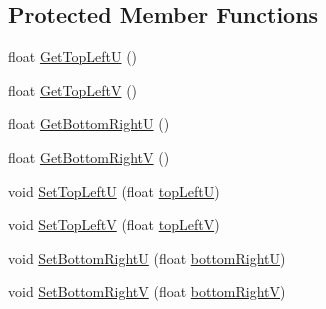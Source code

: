 \subsection*{Protected Member Functions}
\begin{DoxyCompactItemize}
\item 
float \hyperlink{class_osiris_i_1_1_graphics_1_1_actors_1_1_i_sprite_ae7cc783bbe7b0c4f1d20752ff7f34528}{Get\-Top\-Left\-U} ()
\item 
float \hyperlink{class_osiris_i_1_1_graphics_1_1_actors_1_1_i_sprite_a060e4588ac84f05574a38cf26a0601cf}{Get\-Top\-Left\-V} ()
\item 
float \hyperlink{class_osiris_i_1_1_graphics_1_1_actors_1_1_i_sprite_a6395936eeae7bb1c13db61dcefd2056f}{Get\-Bottom\-Right\-U} ()
\item 
float \hyperlink{class_osiris_i_1_1_graphics_1_1_actors_1_1_i_sprite_a32d6f6962077b0a38ae885033544ead3}{Get\-Bottom\-Right\-V} ()
\item 
void \hyperlink{class_osiris_i_1_1_graphics_1_1_actors_1_1_i_sprite_ae5f59adf02198048b5693efe303e37d2}{Set\-Top\-Left\-U} (float \hyperlink{class_osiris_i_1_1_graphics_1_1_actors_1_1_i_sprite_a13ed35d438c71402eff4f43bd062d9e1}{top\-Left\-U})
\item 
void \hyperlink{class_osiris_i_1_1_graphics_1_1_actors_1_1_i_sprite_a342063ca3954c84d33a886c231dd4180}{Set\-Top\-Left\-V} (float \hyperlink{class_osiris_i_1_1_graphics_1_1_actors_1_1_i_sprite_a0103c27e0ef4b6c0117ca3f4e0c82718}{top\-Left\-V})
\item 
void \hyperlink{class_osiris_i_1_1_graphics_1_1_actors_1_1_i_sprite_a75feab9b833acc4215b6ca710c12b5ae}{Set\-Bottom\-Right\-U} (float \hyperlink{class_osiris_i_1_1_graphics_1_1_actors_1_1_i_sprite_a96506456d0f6507c5771cdf13693649c}{bottom\-Right\-U})
\item 
void \hyperlink{class_osiris_i_1_1_graphics_1_1_actors_1_1_i_sprite_a1a7e2464ad96b9d62fbeb3e635373fb1}{Set\-Bottom\-Right\-V} (float \hyperlink{class_osiris_i_1_1_graphics_1_1_actors_1_1_i_sprite_a7e47e523291e7ed33d732e07a603b16f}{bottom\-Right\-V})
\end{DoxyCompactItemize}
